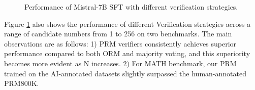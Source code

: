        

\begin{figure}[t]
\centering
{}

\caption{Performance of Mistral-7B SFT with different verification strategies.}
\label{fig:math_gsm8k_sample_n}
\end{figure}

Figure \ref{fig:math_gsm8k_sample_n} also shows the performance of different Verification strategies across a range of candidate numbers from 1 to 256 on two benchmarks. The main observations are as follows: 1) PRM verifiers consistently achieves superior performance compared to both ORM and majority voting, and this superiority becomes more evident as N increases. 2) For MATH benchmark, our PRM trained on the AI-annotated datasets slightly surpassed the human-annotated PRM800K.

